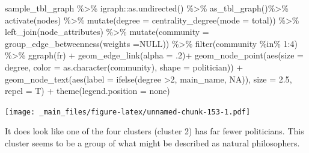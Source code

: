 \documentclass[
]{book}
\newenvironment{Shaded}{\begin{snugshade}}{\end{snugshade}}
\newcommand{\AttributeTok}[1]{\textcolor[rgb]{0.77,0.63,0.00}{#1}}
\newcommand{\ConstantTok}[1]{\textcolor[rgb]{0.00,0.00,0.00}{#1}}
\newcommand{\DecValTok}[1]{\textcolor[rgb]{0.00,0.00,0.81}{#1}}
\newcommand{\FloatTok}[1]{\textcolor[rgb]{0.00,0.00,0.81}{#1}}
\newcommand{\FunctionTok}[1]{\textcolor[rgb]{0.00,0.00,0.00}{#1}}
\newcommand{\NormalTok}[1]{#1}
\newcommand{\SpecialCharTok}[1]{\textcolor[rgb]{0.00,0.00,0.00}{#1}}
\newcommand{\StringTok}[1]{\textcolor[rgb]{0.31,0.60,0.02}{#1}}
\begin{document}
\begin{Shaded}
\begin{Highlighting}[]
\NormalTok{sample\_tbl\_graph }\SpecialCharTok{\%\textgreater{}\%} 
\NormalTok{  igraph}\SpecialCharTok{::}\FunctionTok{as.undirected}\NormalTok{() }\SpecialCharTok{\%\textgreater{}\%} 
  \FunctionTok{as\_tbl\_graph}\NormalTok{()}\SpecialCharTok{\%\textgreater{}\%} 
  \FunctionTok{activate}\NormalTok{(nodes) }\SpecialCharTok{\%\textgreater{}\%} 
  \FunctionTok{mutate}\NormalTok{(}\AttributeTok{degree =} \FunctionTok{centrality\_degree}\NormalTok{(}\AttributeTok{mode =} \StringTok{\textquotesingle{}total\textquotesingle{}}\NormalTok{)) }\SpecialCharTok{\%\textgreater{}\%} 
  \FunctionTok{left\_join}\NormalTok{(node\_attributes) }\SpecialCharTok{\%\textgreater{}\%} 
  \FunctionTok{mutate}\NormalTok{(}\AttributeTok{community =} \FunctionTok{group\_edge\_betweenness}\NormalTok{(}\AttributeTok{weights =}\ConstantTok{NULL}\NormalTok{)) }\SpecialCharTok{\%\textgreater{}\%} 
  \FunctionTok{filter}\NormalTok{(community }\SpecialCharTok{\%in\%} \DecValTok{1}\SpecialCharTok{:}\DecValTok{4}\NormalTok{) }\SpecialCharTok{\%\textgreater{}\%} 
  \FunctionTok{ggraph}\NormalTok{(}\StringTok{\textquotesingle{}fr\textquotesingle{}}\NormalTok{) }\SpecialCharTok{+} 
  \FunctionTok{geom\_edge\_link}\NormalTok{(}\AttributeTok{alpha =}\NormalTok{ .}\DecValTok{2}\NormalTok{)}\SpecialCharTok{+} 
  \FunctionTok{geom\_node\_point}\NormalTok{(}\FunctionTok{aes}\NormalTok{(}\AttributeTok{size =}\NormalTok{ degree, }\AttributeTok{color =} \FunctionTok{as.character}\NormalTok{(community), }\AttributeTok{shape =}\NormalTok{ politician))  }\SpecialCharTok{+} 
  \FunctionTok{geom\_node\_text}\NormalTok{(}\FunctionTok{aes}\NormalTok{(}\AttributeTok{label =} \FunctionTok{ifelse}\NormalTok{(degree }\SpecialCharTok{\textgreater{}}\DecValTok{2}\NormalTok{, main\_name, }\ConstantTok{NA}\NormalTok{)), }\AttributeTok{size =} \FloatTok{2.5}\NormalTok{, }\AttributeTok{repel =}\NormalTok{ T) }\SpecialCharTok{+} 
  \FunctionTok{theme}\NormalTok{(}\AttributeTok{legend.position =} \StringTok{\textquotesingle{}none\textquotesingle{}}\NormalTok{)}
\end{Highlighting}
\end{Shaded}

\texttt{[image: \_main\_files/figure-latex/unnamed-chunk-153-1.pdf]}

It does look like one of the four clusters (cluster 2) has far fewer politicians. This cluster seems to be a group of what might be described as natural philosophers.
\end{document}
